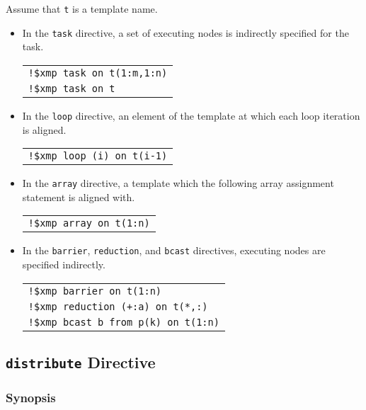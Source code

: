 Assume that {\tt t} is a template name. 

\begin{itemize}
\item In the {\tt task} directive, a set of executing nodes is indirectly specified for the task.

\begin{tabular}{l}
\verb|!$xmp task on t(1:m,1:n)| \\
\verb|!$xmp task on t| \\
\end{tabular}

\item In the {\tt loop} directive, an element of the template at which each loop iteration is aligned.

\begin{tabular}{l}
\verb|!$xmp loop (i) on t(i-1)| \\
\end{tabular}

\item In the {\tt array} directive, a template which the following array assignment statement is aligned with.

\begin{tabular}{l}
\verb|!$xmp array on t(1:n)| \\
\end{tabular}

\item In the {\tt barrier}, {\tt reduction}, and {\tt bcast} directives,
executing nodes are specified indirectly. 

\begin{tabular}{l}
\verb|!$xmp barrier on t(1:n)| \\
\verb|!$xmp reduction (+:a) on t(*,:)| \\
\verb|!$xmp bcast b from p(k) on t(1:n)| \\
\end{tabular}

\end{itemize}

\subsection{{\tt distribute} Directive}

\subsubsection*{Synopsis}

